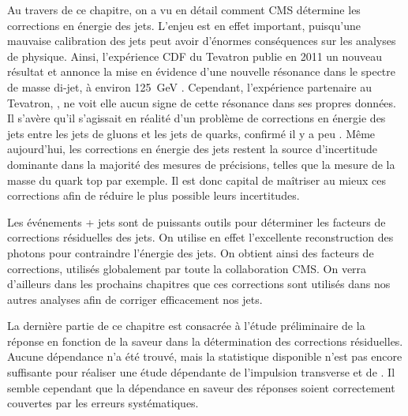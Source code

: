 Au travers de ce chapitre, on a vu en détail comment CMS détermine les corrections en énergie des jets. L'enjeu est en effet important, puisqu'une mauvaise calibration des jets peut avoir d'énormes conséquences sur les analyses de physique. Ainsi, l'expérience CDF du Tevatron publie en 2011 un nouveau résultat et annonce la mise en évidence d'une nouvelle résonance dans le spectre de masse di-jet, à environ \SI{125}{\GeV} \citep{CDF_old}. Cependant, l'expérience partenaire au Tevatron, \dzero, ne voit elle aucun signe de cette résonance dans ses propres données. Il s'avère qu'il s'agissait en réalité d'un problème de corrections en énergie des jets entre les jets de gluons et les jets de quarks, confirmé il y a peu \citep{CDF_new}. Même aujourd'hui, les corrections en énergie des jets restent la source d'incertitude dominante dans la majorité des mesures de précisions, telles que la mesure de la masse du quark top par exemple. Il est donc capital de maîtriser au mieux ces corrections afin de réduire le plus possible leurs incertitudes.

\bigskip

Les événements \Pphoton + jets sont de puissants outils pour déterminer les facteurs de corrections résiduelles des jets. On utilise en effet l'excellente reconstruction des photons pour contraindre l'énergie des jets. On obtient ainsi des facteurs de corrections, utilisés globalement par toute la collaboration CMS. On verra d'ailleurs dans les prochains chapitres que ces corrections sont utilisés dans nos autres analyses afin de corriger efficacement nos jets.

\bigskip

La dernière partie de ce chapitre est consacrée à l'étude préliminaire de la réponse en fonction de la saveur dans la détermination des corrections résiduelles. Aucune dépendance n'a été trouvé, mais la statistique disponible n'est pas encore suffisante pour réaliser une étude dépendante de l'impulsion transverse et de \aeta. Il semble cependant que la dépendance en saveur des réponses soient correctement couvertes par les erreurs systématiques.